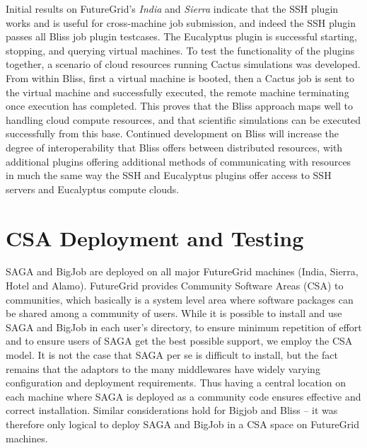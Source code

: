 \documentclass[]{paper}
\begin{document}
Initial results on FutureGrid's \textit{India} and \textit{Sierra} indicate that the
SSH plugin works and is useful for cross-machine
job submission, and indeed the SSH plugin passes all Bliss job plugin testcases.
The Eucalyptus plugin is successful starting, stopping, and querying virtual machines.
To test the functionality of the plugins together, a scenario of cloud resources running
Cactus simulations was developed.  From within Bliss, first a virtual machine is booted, 
then a Cactus job is sent to the virtual machine and successfully executed,
 the remote machine terminating
once execution has completed.  This proves that the Bliss approach maps well to handling
cloud compute resources, and that scientific simulations can be executed successfully from this
base.  Continued development on Bliss will increase the degree of interoperability that Bliss
offers between distributed resources, with additional plugins offering additional methods of
communicating with resources in much the same way the SSH and Eucalyptus plugins offer
access to SSH servers and Eucalyptus compute clouds.


\section{CSA Deployment and Testing}

SAGA and BigJob are deployed on all major FutureGrid machines (India,
Sierra, Hotel and Alamo).  FutureGrid provides Community Software
Areas (CSA) to communities, which basically is a system level area
where software packages can be shared among a community of users.
While it is possible to install and use SAGA and BigJob in each user's
directory, to ensure minimum repetition of effort and to ensure users
of SAGA get the best possible support, we employ the CSA model.  It is
not the case that SAGA per se is difficult to install, but the fact
remains that the adaptors to the many middlewares have widely varying
configuration and deployment requirements.  Thus having a central
location on each machine where SAGA is deployed as a community code
ensures effective and correct installation.  Similar considerations
hold for Bigjob and Bliss --  it was therefore only logical to deploy
SAGA and BigJob in a CSA space on FutureGrid machines.
\end{document}
